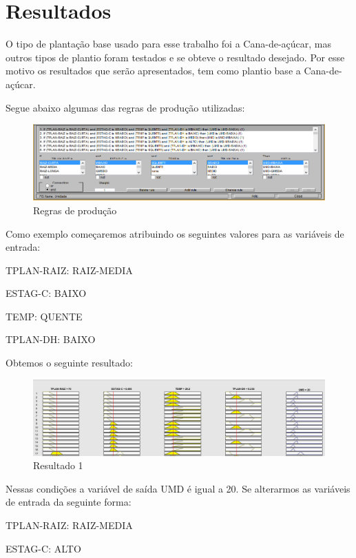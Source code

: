 \section{Resultados}

O tipo de plantação base usado para esse trabalho foi a Cana-de-açúcar, mas outros tipos de plantio foram testados e se obteve o resultado desejado. Por esse motivo os resultados que serão apresentados, tem como plantio base a Cana-de-açúcar.

Segue abaixo algumas das regras de produção utilizadas: 

\begin{figure}[h!]
\centering
\includegraphics[width=1\linewidth]{Resultados/Imagens/regras}
\caption{Regras de produção}
\label{fig:Regras}
\end{figure}

Como exemplo começaremos atribuindo os seguintes valores para as variáveis de entrada:

TPLAN-RAIZ: RAIZ-MEDIA

ESTAG-C: BAIXO

TEMP: QUENTE

TPLAN-DH: BAIXO

Obtemos o seguinte resultado:

\begin{figure}[h!]
\centering
\includegraphics[width=1\linewidth]{Resultados/Imagens/resultado1}
\caption{Resultado 1}
\label{fig:resultado1}
\end{figure}

Nessas condições a variável de saída UMD é igual a 20. Se alterarmos as variáveis de entrada da seguinte forma:  

TPLAN-RAIZ: RAIZ-MEDIA

ESTAG-C: ALTO

